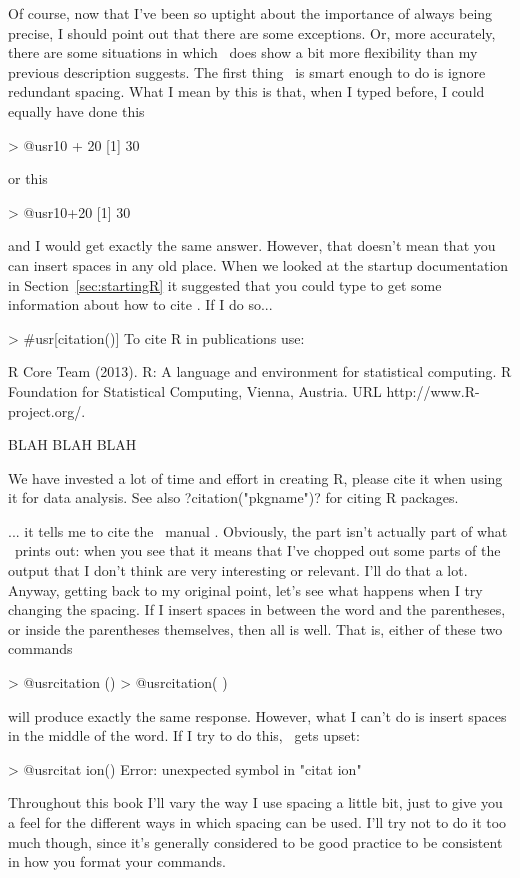 Of course, now that I've been so uptight about the importance of always being precise, I should point out that there are some exceptions. Or, more accurately, there are some situations in which \R\ does show a bit more flexibility than my previous description suggests. The first thing \R\ is smart enough to do is ignore redundant spacing. What I mean by this is that, when I typed  before, I could equally have done this
\begin{rblock1}
> @usr{10    + 20}
[1] 30
\end{rblock1}
or this 
\begin{rblock1}
> @usr{10+20}
[1] 30
\end{rblock1}
and I would get exactly the same answer. However, that doesn't mean that you can insert spaces in any old place. When we looked at the startup documentation in Section~\ref{sec:startingR} it suggested that you could type  to get some information about how to cite \R. If I do so...
\begin{rblock2}
> #usr[citation()]
To cite R in publications use:

  R Core Team (2013). R: A language and environment
  for statistical computing. R Foundation for
  Statistical Computing, Vienna, Austria. URL
  http://www.R-project.org/.

BLAH BLAH BLAH

We have invested a lot of time and effort in creating
R, please cite it when using it for data analysis. See
also ?citation("pkgname")? for citing R packages.
\end{rblock2}
... it tells me to cite the \R\ manual \cite{R2013}. Obviously, the  part isn't actually part of what \R\ prints out: when you see that it means that I've chopped out some parts of the output that I don't think are very interesting or relevant. I'll do that a lot. Anyway, getting back to my original point, let's see what happens when I try changing the spacing. If I insert spaces in between the word and the parentheses, or inside the parentheses themselves, then all is well. That is, either of these two commands
\begin{rblock1}
> @usr{citation ()}
> @usr{citation(  )}
\end{rblock1}
will produce exactly the same response. However, what I can't do is insert spaces in the middle of the word. If I try to do this, \R\ gets upset:
\begin{rblock1}
> @usr{citat ion()}
Error: unexpected symbol in "citat ion"
\end{rblock1}
Throughout this book I'll vary the way I use spacing a little bit, just to give you a feel for the different ways in which spacing can be used. I'll try not to do it too much though, since it's generally considered to be good practice to be consistent in how you format your commands. 

